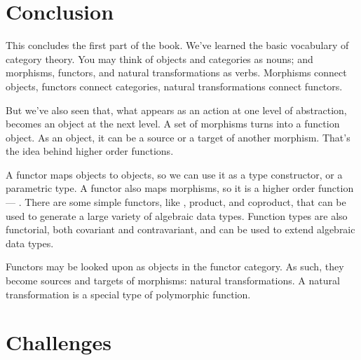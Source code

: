 \section{Conclusion}

This concludes the first part of the book. We've learned the basic
vocabulary of category theory. You may think of objects and categories
as nouns; and morphisms, functors, and natural transformations as verbs.
Morphisms connect objects, functors connect categories, natural
transformations connect functors.

But we've also seen that, what appears as an action at one level of
abstraction, becomes an object at the next level. A set of morphisms
turns into a function object. As an object, it can be a source or a
target of another morphism. That's the idea behind higher order
functions.

A functor maps objects to objects, so we can use it as a type
constructor, or a parametric type. A functor also maps morphisms, so it
is a higher order function --- . There are some simple
functors, like , product, and coproduct, that can be used
to generate a large variety of algebraic data types. Function types are
also functorial, both covariant and contravariant, and can be used to
extend algebraic data types.

Functors may be looked upon as objects in the functor category. As such,
they become sources and targets of morphisms: natural transformations. A
natural transformation is a special type of polymorphic function.

\section{Challenges}

